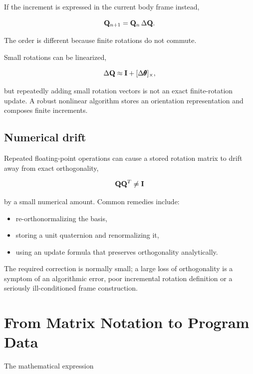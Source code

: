 If the increment is expressed in the current body frame instead,

\begin{equation}\label{eq:coord-body-update}
    \mathbf{Q}_{n+1}=\mathbf{Q}_{n}\,\Delta\mathbf{Q}.
\end{equation}

The order is different because finite rotations do not commute.

Small rotations can be linearized,

\begin{equation}
    \Delta\mathbf{Q}
    \approx
    \mathbf{I}+[\Delta\pmb{\theta}]_{\times},
\end{equation}

but repeatedly adding small rotation vectors is not an exact finite-rotation
update. A robust nonlinear algorithm stores an orientation representation and
composes finite increments.

\subsection{Numerical drift}

Repeated floating-point operations can cause a stored rotation matrix to drift
away from exact orthogonality,

\begin{equation}
    \mathbf{Q}\mathbf{Q}^{T}\neq\mathbf{I}
\end{equation}

by a small numerical amount. Common remedies include:

\begin{itemize}
    \item re-orthonormalizing the basis,
    \item storing a unit quaternion and renormalizing it,
    \item using an update formula that preserves orthogonality analytically.
\end{itemize}

The required correction is normally small; a large loss of orthogonality is a
symptom of an algorithmic error, poor incremental rotation definition or a
seriously ill-conditioned frame construction.

\section{From Matrix Notation to Program Data}

The mathematical expression

